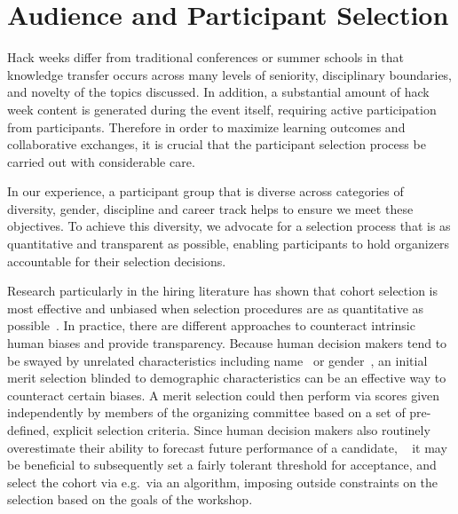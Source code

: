 \section*{Audience and Participant Selection}
Hack weeks differ from traditional conferences or summer schools in that knowledge transfer occurs across many levels of seniority, disciplinary boundaries, and novelty of the topics discussed.
In addition, a substantial amount of hack week content is generated during the event itself, requiring active participation from participants.
Therefore in order to maximize learning outcomes and collaborative exchanges, it is crucial that the participant selection process be carried out with considerable care.

In our experience, a participant group that is diverse across categories of diversity, gender, discipline and career track helps to ensure we meet these objectives.
To achieve this diversity, we advocate for a selection process that is as quantitative and transparent as possible, enabling participants to hold organizers accountable for their selection decisions.

Research particularly in the hiring literature has shown that cohort selection is most effective and unbiased when selection procedures are as quantitative as possible~\cite{sunstein2015wiser,bohnet2016}.
In practice, there are different approaches to counteract intrinsic human biases and provide transparency.
Because human decision makers tend to be swayed by unrelated characteristics including name~\cite{bertrand2004} or gender~\cite{mossracusin2012}, an initial merit selection blinded to demographic characteristics can be an effective way to counteract certain biases. A merit selection could then perform via scores given independently by members of the organizing committee based on a set of pre-defined, explicit selection criteria.
Since human decision makers also routinely overestimate their ability to forecast future performance of a candidate, ~\cite{highhouse2008} it may be beneficial to subsequently set a fairly tolerant threshold for acceptance, and select the cohort via e.g.\ via an algorithm, imposing outside constraints on the selection based on the goals of the workshop.

